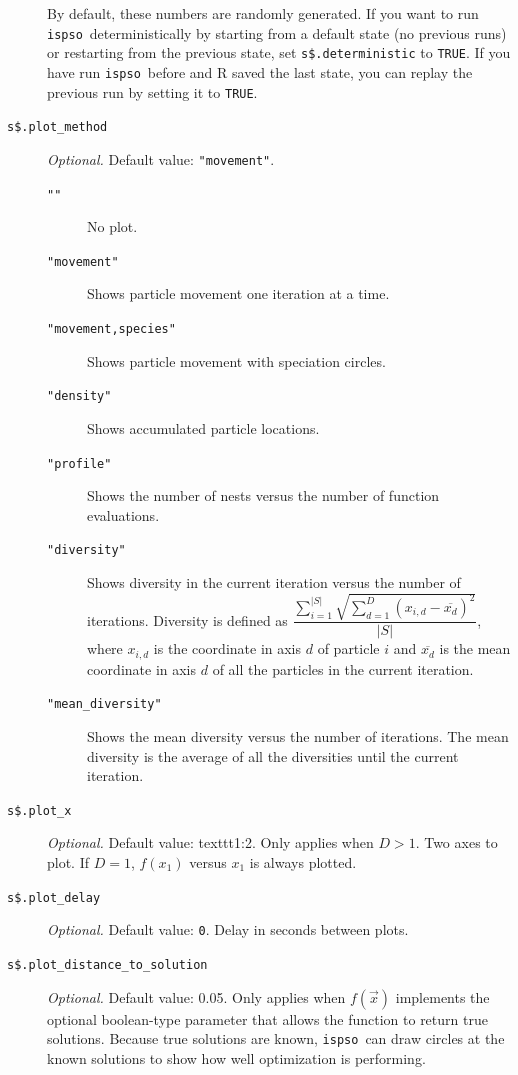 \documentclass{article}
\def\ispso{\texttt{ispso}}
\begin{document}
\begin{description}
    By default, these numbers are randomly generated.
    If you want to run \ispso\ deterministically by starting from a default state (no previous runs) or restarting from the previous state, set \texttt{s\$.deterministic} to \texttt{TRUE}.
    If you have run \ispso\ before and R saved the last state, you can replay the previous run by setting it to \texttt{TRUE}.
  \item[\texttt{s\$.plot\_method}]
    \textit{Optional.}
    Default value: \texttt{"movement"}.
    \begin{description}
      \item[\texttt{""}]
	No plot.
      \item[\texttt{"movement"}]
	Shows particle movement one iteration at a time.
      \item[\texttt{"movement,species"}]
	Shows particle movement with speciation circles.
      \item[\texttt{"density"}]
	Shows accumulated particle locations.
      \item[\texttt{"profile"}]
	Shows the number of nests versus the number of function evaluations.
      \item[\texttt{"diversity"}]
	Shows diversity in the current iteration versus the number of iterations.
	Diversity is defined as $\dfrac{\sum_{i=1}^{|S|}\sqrt{\sum_{d=1}^D\left(x_{i,d}-\overline{x_d}\right)^2}}{|S|}$, where $x_{i,d}$ is the coordinate in axis $d$ of particle $i$ and $\overline{x_d}$ is the mean coordinate in axis $d$ of all the particles in the current iteration.
      \item[\texttt{"mean\_diversity"}]
	Shows the mean diversity versus the number of iterations.
	The mean diversity is the average of all the diversities until the current iteration.
    \end{description}
  \item[\texttt{s\$.plot\_x}]
    \textit{Optional.}
    Default value: texttt{1:2}.
    Only applies when $D>1$.
    Two axes to plot.
    If $D=1$, $f(x_1)$ versus $x_1$ is always plotted.
  \item[\texttt{s\$.plot\_delay}]
    \textit{Optional.}
    Default value: \texttt{0}.
    Delay in seconds between plots.
  \item[\texttt{s\$.plot\_distance\_to\_solution}]
    \textit{Optional.}
    Default value: 0.05.
    Only applies when $f(\vec{x})$ implements the optional boolean-type parameter that allows the function to return true solutions.
    Because true solutions are known, \ispso\ can draw circles at the known solutions to show how well optimization is performing.

\end{description}
\end{document}
